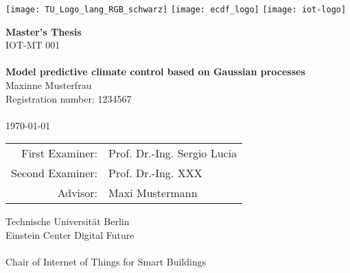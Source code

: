 \begin{titlepage}
		\texttt{[image: TU\_Logo\_lang\_RGB\_schwarz]}
\hfill
			\texttt{[image: ecdf\_logo]}
			\texttt{[image: iot-logo]}
    \begin{center}
			\vspace{2mm}
    \vfill
      \Large\textbf{Master's Thesis}\\
             \normalsize IOT-MT 001 %
			\LARGE \\~\\
      \textbf{Model predictive climate control based on Gaussian processes}\\
    \vspace{\fill}
      \Large Maxinne Musterfrau\\
      \small Registration number: 1234567\\
       ~\\
       \today \\
		\vfill
		  \normalsize
			\begin{tabular}{rl}
				First Examiner: & Prof. Dr.-Ing. Sergio Lucia\tabularnewline
				Second Examiner: & Prof. Dr.-Ing. XXX \tabularnewline
                Advisor:   & Maxi Mustermann\tabularnewline
			\end{tabular}
    \vfill
      \small  {}
			Technische Universit\"at Berlin\\
			Einstein Center Digital Future\\
			~\\
			{Chair of Internet of Things for Smart Buildings}\\

\end{center}
\end{titlepage}
